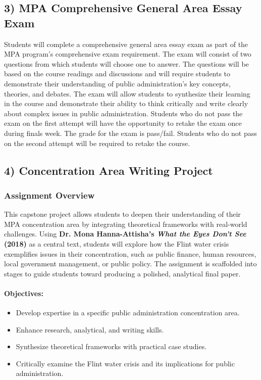 \documentclass[11pt, letterpaper]{article}
\begin{document}
\subsection*{3) MPA Comprehensive General Area Essay Exam}

Students will complete a comprehensive general area essay exam as part of the MPA program's comprehensive exam requirement. The exam will consist of two questions from which students will choose one to answer. The questions will be based on the course readings and discussions and will require students to demonstrate their understanding of public administration's key concepts, theories, and debates. The exam will allow students to synthesize their learning in the course and demonstrate their ability to think critically and write clearly about complex issues in public administration. Students who do not pass the exam on the first attempt will have the opportunity to retake the exam once during finals week. The grade for the exam is pass/fail. Students who do not pass on the second attempt will be required to retake the course.

\subsection*{4) Concentration Area Writing Project}

\subsubsection*{Assignment Overview}

This capstone project allows students to deepen their understanding of their MPA concentration area by integrating theoretical frameworks with real-world challenges. Using \textbf{Dr. Mona Hanna-Attisha's \textit{What the Eyes Don’t See} (2018)} as a central text, students will explore how the Flint water crisis exemplifies issues in their concentration, such as public finance, human resources, local government management, or public policy. The assignment is scaffolded into stages to guide students toward producing a polished, analytical final paper.

\paragraph*{Objectives:}
\begin{itemize}
    \item Develop expertise in a specific public administration concentration area.
    \item Enhance research, analytical, and writing skills.
    \item Synthesize theoretical frameworks with practical case studies.
    \item Critically examine the Flint water crisis and its implications for public administration.
\end{itemize}
\end{document}
